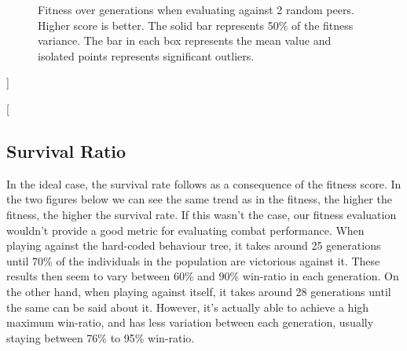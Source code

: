 \documentclass[a4paper, twocolumn]{article}
\begin{document}
{\begin{figure}[H]
\begin{minipage}{\textwidth}
                \caption{Fitness over generations when evaluating against 2 random peers. Higher score is better. The solid bar represents 50\% of the fitness variance. The bar in each box represents the mean value and isolated points represents significant outliers.}
                \label{fig:fitness-against-random}
            \end{minipage}
        \end{figure}

}]

    \twocolumn[{
        \subsection{Survival Ratio} \label{sec:survival_ratio}
        In the ideal case, the survival rate follows as a consequence of the fitness score. In the two figures below we can see the same trend as in the fitness, the higher the fitness, the higher the survival rate. If this wasn't the case, our fitness evaluation wouldn't provide a good metric for evaluating combat performance. When playing against the hard-coded behaviour tree, it takes around 25 generations until 70\% of the individuals in the population are victorious against it. These results then seem to vary between 60\% and 90\% win-ratio in each generation. On the other hand, when playing against itself, it takes around 28 generations until the same can be said about it. However, it's actually able to achieve a high maximum win-ratio, and has less variation between each generation, usually staying between 76\% to 95\% win-ratio.

}
\end{document}
